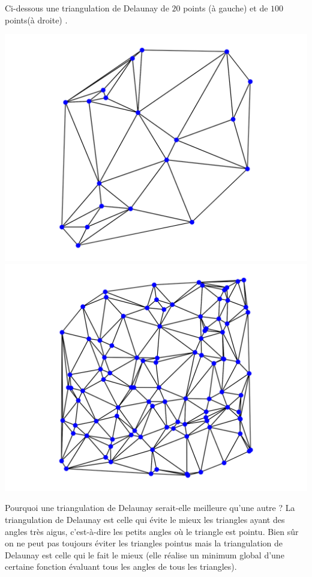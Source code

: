 \documentclass[11pt,class=report,crop=false]{standalone}
\begin{document}
Ci-dessous une triangulation de Delaunay de $20$ points (à gauche) et de $100$ points(à droite) .
\begin{center}
	\includegraphics[scale=\myscale,scale=0.4]{figures/delaunay01}
	\qquad
	\includegraphics[scale=\myscale,scale=0.4]{figures/delaunay02}	
\end{center}

\bigskip

Pourquoi une triangulation de Delaunay serait-elle meilleure qu'une autre ?
La triangulation de Delaunay est celle qui évite le mieux les triangles ayant des angles très aigus, c'est-à-dire les petits angles où le triangle est pointu.
Bien sûr on ne peut pas toujours éviter les triangles pointus mais la triangulation de Delaunay est celle qui le fait le mieux (elle réalise un minimum global d'une certaine fonction évaluant tous les angles de tous les triangles).
\end{document}
